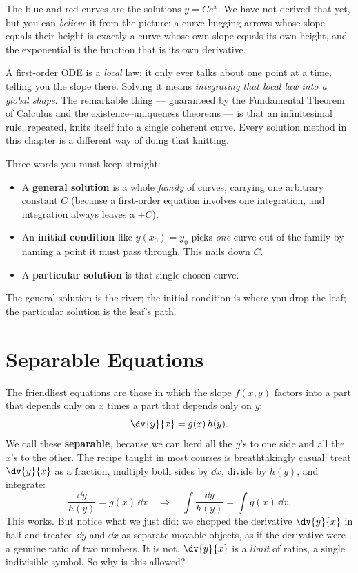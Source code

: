 The blue and red curves are the solutions $y = Ce^{x}$. We have not derived that
yet, but you can \emph{believe} it from the picture: a curve hugging arrows whose
slope equals their height is exactly a curve whose own slope equals its own height,
and the exponential is the function that is its own derivative.

\begin{happeningbox}
A first-order ODE is a \emph{local} law: it only ever talks about one point at a
time, telling you the slope there. Solving it means \emph{integrating that
local law into a global shape}. The remarkable thing --- guaranteed by the
Fundamental Theorem of Calculus and the existence--uniqueness theorems --- is that
an infinitesimal rule, repeated, knits itself into a single coherent curve. Every
solution method in this chapter is a different way of doing that knitting.
\end{happeningbox}

\begin{focusbox}
Three words you must keep straight:
\begin{itemize}
\item A \textbf{general solution} is a whole \emph{family} of curves, carrying one
arbitrary constant $C$ (because a first-order equation involves one integration,
and integration always leaves a $+C$).
\item An \textbf{initial condition} like $y(x_0)=y_0$ picks \emph{one} curve out of
the family by naming a point it must pass through. This nails down $C$.
\item A \textbf{particular solution} is that single chosen curve.
\end{itemize}
The general solution is the river; the initial condition is where you drop the
leaf; the particular solution is the leaf's path.
\end{focusbox}

\section{Separable Equations}

The friendliest equations are those in which the slope $f(x,y)$ factors into a part
that depends only on $x$ times a part that depends only on $y$:
\[
  \dv{y}{x} = g(x)\,h(y).
\]
We call these \textbf{separable}, because we can herd all the $y$'s to one side and
all the $x$'s to the other. The recipe taught in most courses is breathtakingly
casual: treat $\dv{y}{x}$ as a fraction, multiply both sides by $\dd x$, divide by
$h(y)$, and integrate:
\[
  \frac{\dd y}{h(y)} = g(x)\,\dd x
  \quad\Longrightarrow\quad
  \int \frac{\dd y}{h(y)} = \int g(x)\,\dd x.
\]
This works. But notice what we just did: we chopped the derivative $\dv{y}{x}$ in
half and treated $\dd y$ and $\dd x$ as separate movable objects, as if the
derivative were a genuine ratio of two numbers. It is not. $\dv{y}{x}$ is a
\emph{limit} of ratios, a single indivisible symbol. So why is this allowed?

